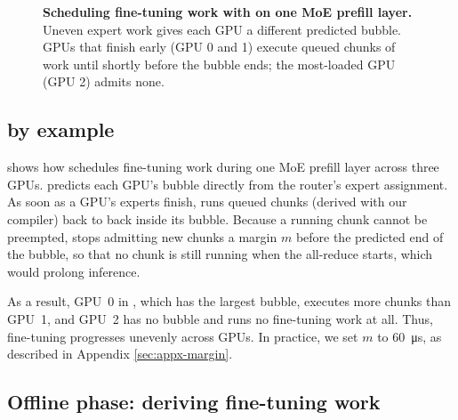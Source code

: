 \begin{figure}[t]
\centering
{}
\caption{\textbf{Scheduling fine-tuning work with \sys on one \ac{MoE} prefill layer.}
Uneven expert work gives each GPU a different predicted bubble.
GPUs that finish early (GPU 0 and 1) execute queued chunks of work until shortly before the bubble ends; the most-loaded GPU (GPU 2) admits none.}
\label{fig:bubble_schedule}
\end{figure}

\subsection{\sys{} by example}
\label{sec:design-overview}

 shows how \sys schedules fine-tuning work during one \ac{MoE} prefill layer across three GPUs.
\sys predicts each GPU's bubble directly from the router's expert assignment.
As soon as a GPU's experts finish, \sys runs queued chunks (derived with our compiler) back to back inside its bubble.
Because a running chunk cannot be preempted, \sys stops admitting new chunks a margin $m$ before the predicted end of the bubble, so that no chunk is still running when the all-reduce starts, which would prolong inference.

As a result, GPU~0 in , which has the largest bubble, executes more chunks than GPU~1, and GPU~2 has no bubble and runs no fine-tuning work at all.
Thus, fine-tuning progresses unevenly across GPUs.
In practice, we set $m$ to \SI{60}{\micro\second}, as described in Appendix \ref{sec:appx-margin}.

\subsection{Offline phase: deriving fine-tuning work}

\label{sec:design-compiler}

